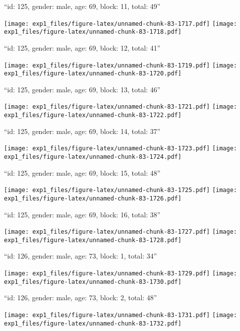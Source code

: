 \documentclass[11pt,,]{article}
\begin{document}
\newpage
[1] 

``id: 125, gender: male, age: 69, block: 11, total: 49''

\texttt{[image: exp1\_files/figure-latex/unnamed-chunk-83-1717.pdf]}
\texttt{[image: exp1\_files/figure-latex/unnamed-chunk-83-1718.pdf]}

\newpage
[1] 

``id: 125, gender: male, age: 69, block: 12, total: 41''

\texttt{[image: exp1\_files/figure-latex/unnamed-chunk-83-1719.pdf]}
\texttt{[image: exp1\_files/figure-latex/unnamed-chunk-83-1720.pdf]}

\newpage
[1] 

``id: 125, gender: male, age: 69, block: 13, total: 46''

\texttt{[image: exp1\_files/figure-latex/unnamed-chunk-83-1721.pdf]}
\texttt{[image: exp1\_files/figure-latex/unnamed-chunk-83-1722.pdf]}

\newpage
[1] 

``id: 125, gender: male, age: 69, block: 14, total: 37''

\texttt{[image: exp1\_files/figure-latex/unnamed-chunk-83-1723.pdf]}
\texttt{[image: exp1\_files/figure-latex/unnamed-chunk-83-1724.pdf]}

\newpage
[1] 

``id: 125, gender: male, age: 69, block: 15, total: 48''

\texttt{[image: exp1\_files/figure-latex/unnamed-chunk-83-1725.pdf]}
\texttt{[image: exp1\_files/figure-latex/unnamed-chunk-83-1726.pdf]}

\newpage
[1] 

``id: 125, gender: male, age: 69, block: 16, total: 38''

\texttt{[image: exp1\_files/figure-latex/unnamed-chunk-83-1727.pdf]}
\texttt{[image: exp1\_files/figure-latex/unnamed-chunk-83-1728.pdf]}

\newpage
[1] 

``id: 126, gender: male, age: 73, block: 1, total: 34''

\texttt{[image: exp1\_files/figure-latex/unnamed-chunk-83-1729.pdf]}
\texttt{[image: exp1\_files/figure-latex/unnamed-chunk-83-1730.pdf]}

\newpage
[1] 

``id: 126, gender: male, age: 73, block: 2, total: 48''

\texttt{[image: exp1\_files/figure-latex/unnamed-chunk-83-1731.pdf]}
\texttt{[image: exp1\_files/figure-latex/unnamed-chunk-83-1732.pdf]}
\end{document}
